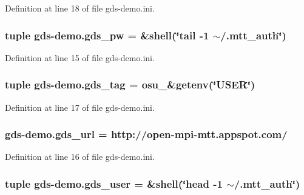 Definition at line 18 of file gds-\/demo.\-ini.

\hypertarget{namespacegds-demo_ae8f847cfa457e3ef0c5fa370200cf06c}{
\subsubsection[{gds\-\_\-pw}]{\setlength{\rightskip}{0pt plus 5cm}tuple gds-\/demo.\-gds\-\_\-pw = \&shell(\char`\"{}tail -\/1 $\sim$/.mtt\-\_\-auth\char`\"{})}}\label{namespacegds-demo_ae8f847cfa457e3ef0c5fa370200cf06c}


Definition at line 15 of file gds-\/demo.\-ini.

\hypertarget{namespacegds-demo_a89bef1abf605d724804682af1e5a0fb4}{
\subsubsection[{gds\-\_\-tag}]{\setlength{\rightskip}{0pt plus 5cm}tuple gds-\/demo.\-gds\-\_\-tag = osu\-\_\-\&getenv(\char`\"{}U\-S\-E\-R\char`\"{})}}\label{namespacegds-demo_a89bef1abf605d724804682af1e5a0fb4}


Definition at line 17 of file gds-\/demo.\-ini.

\hypertarget{namespacegds-demo_a9d1bc7e10684b9a35809bd57826a72eb}{
\subsubsection[{gds\-\_\-url}]{\setlength{\rightskip}{0pt plus 5cm}gds-\/demo.\-gds\-\_\-url = http\-://open-\/mpi-\/mtt.\-appspot.\-com/}}\label{namespacegds-demo_a9d1bc7e10684b9a35809bd57826a72eb}


Definition at line 16 of file gds-\/demo.\-ini.

\hypertarget{namespacegds-demo_aa9c2bc4e0238cad5803c9b33aace1e59}{
\subsubsection[{gds\-\_\-user}]{\setlength{\rightskip}{0pt plus 5cm}tuple gds-\/demo.\-gds\-\_\-user = \&shell(\char`\"{}head -\/1 $\sim$/.mtt\-\_\-auth\char`\"{})}}\label{namespacegds-demo_aa9c2bc4e0238cad5803c9b33aace1e59}


